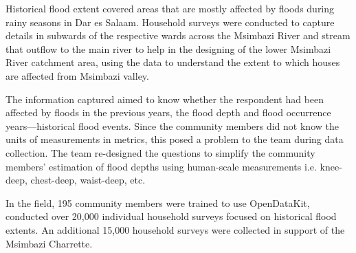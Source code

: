\documentclass[a4paper,12pt,twoside]{article}
\begin{document}
\begin{multicols}{2}
Historical flood extent covered areas that are mostly affected by floods during rainy seasons in Dar es Salaam. Household surveys were conducted to capture details in subwards of the respective wards across the Msimbazi River and stream that outflow to the main river to help in the designing of the lower Msimbazi River catchment area, using the data to understand the extent to which houses are affected from Msimbazi valley.

The information captured aimed to know whether the respondent had been affected by floods in the previous years, the flood depth and flood occurrence years---historical flood events. Since the community members did not know the units of measurements in metrics, this posed a problem to the team during data collection. The team re-designed the questions to simplify the community members’ estimation of flood depths using human-scale measurements i.e. knee-deep, chest-deep, waist-deep, etc.

In the field, 195 community members were trained to use OpenDataKit, conducted over 20,000 individual household surveys focused on historical flood extents. An additional 15,000 household surveys were collected in support of the Msimbazi Charrette. 
\end{multicols}

\newpage
\end{document}
